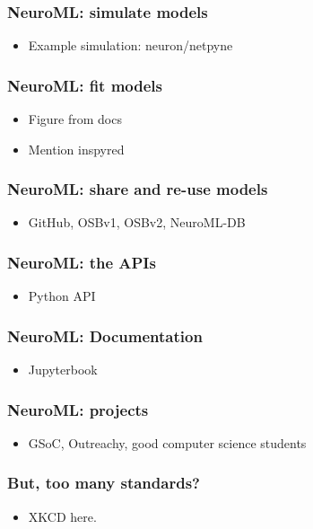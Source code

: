 \begin{frame}[c]
  \frametitle{NeuroML: simulate models}
  \begin{itemize}
    \item Example simulation: neuron/netpyne
  \end{itemize}
\end{frame}
\begin{frame}[c]
  \frametitle{NeuroML: fit models}
  \begin{itemize}
    \item Figure from docs
    \item Mention inspyred
  \end{itemize}
\end{frame}
\begin{frame}[c]
  \frametitle{NeuroML: share and re-use models}
  \begin{itemize}
    \item GitHub, OSBv1, OSBv2, NeuroML-DB
  \end{itemize}
\end{frame}
\begin{frame}[c]
  \frametitle{NeuroML: the APIs}
  \begin{itemize}
    \item Python API
  \end{itemize}
\end{frame}
\begin{frame}[c]
  \frametitle{NeuroML: Documentation}
  \begin{itemize}
    \item Jupyterbook
  \end{itemize}
\end{frame}
\begin{frame}[c]
  \frametitle{NeuroML: projects}
  \begin{itemize}
    \item GSoC, Outreachy, good computer science students
  \end{itemize}
\end{frame}
\begin{frame}[c]
  \frametitle{But, too many standards?}
  \begin{itemize}
    \item XKCD here.
  \end{itemize}
\end{frame}

